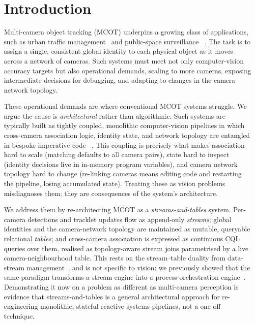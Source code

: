 \documentclass[review]{elsarticle}
\begin{document}
\section{Introduction}
\label{sec:intro}

Multi-camera object tracking (MCOT) underpins a growing class of applications, such as urban traffic management~\cite{9151096} and public-space surveillance~\cite{thirde2006multi,bhuyan2007tracking} .%
The task is to assign a single,
consistent global identity to each physical object as it moves across a network of cameras. Such systems must meet not only computer-vision accuracy targets but also operational
demands, scaling to more cameras, exposing intermediate decisions for debugging, and adapting to changes in the camera network topology.

These operational demands are where conventional MCOT systems struggle. We argue the cause is \emph{architectural} rather than algorithmic. Such systems are typically built as tightly coupled,
monolithic computer-vision pipelines in which cross-camera association logic, identity state, and
network topology are entangled in bespoke imperative code~\cite{yoshida2024overlap,kim2024cluster,xie2024robust} %
. This coupling is precisely what makes association hard to scale (matching defaults to all camera pairs), state hard to inspect (identity decisions live in in-memory program variables), and camera network topology hard to change (re-linking cameras means editing code and restarting the pipeline, losing accumulated state). Treating these as vision problems misdiagnoses them; they are consequences of the system's architecture.

We address them by re-architecting MCOT as a \emph{streams-and-tables} system. Per-camera detections and tracklet updates flow as append-only \emph{streams}; global identities and the
camera-network topology are maintained as mutable, queryable relational \emph{tables}; and cross-camera association is expressed as continuous CQL queries over them, realised as
topology-aware stream joins parametrised by a live camera-neighbourhood table. This rests on the
stream--table duality from data-stream management~\cite{sax2018streams,DBLP:conf/dbpl/ArasuBW03},
and is not specific to vision: we previously showed that the same paradigm transforms a stream engine into a process-orchestration engine~\cite{awad2025best}. Demonstrating it now on a problem
as different as multi-camera perception is evidence that streams-and-tables is a general architectural approach for re-engineering monolithic, stateful reactive systems pipelines, not a one-off technique.
\end{document}
